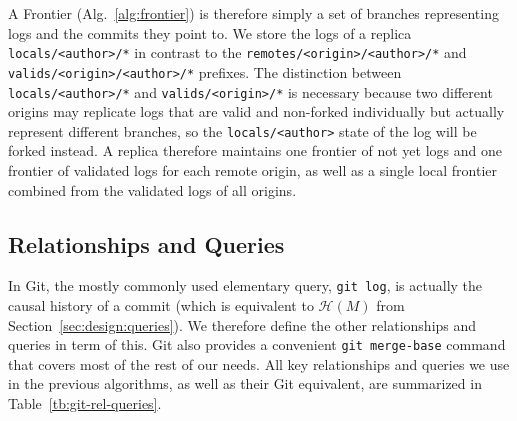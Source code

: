 \documentclass[9pt, oneside]{article}   	%
\begin{document}
A Frontier (Alg.~\ref{alg:frontier}) is therefore simply a set of branches representing logs and the commits they point to. We store the logs of a replica \texttt{locals/<author>/*} in contrast to the \texttt{remotes/<origin>/<author>/*} and \texttt{valids/<origin>/<author>/*} prefixes. The distinction between \texttt{locals/<author>/*} and \texttt{valids/<origin>/*} is necessary because two different origins may replicate logs that are valid and non-forked individually but actually represent different branches, so the \texttt{locals/<author>} state of the log will be forked instead. A replica therefore maintains one frontier of not yet logs and one frontier of validated logs for each remote origin, as well as a single local frontier combined from the validated logs of all origins.

\subsection{Relationships and Queries}
\label{sec:git-implementation:rel-queries}

In Git, the mostly commonly used elementary query, \texttt{git log}, is actually the causal history of a commit (which is equivalent to $\mathcal{H}(M)$ from Section~\ref{sec:design:queries}). We therefore define the other relationships and queries in term of this. Git also provides a convenient \texttt{git merge-base} command that covers most of the rest of our needs. All key relationships and queries we use in the previous algorithms, as well as their Git equivalent, are summarized in Table~\ref{tb:git-rel-queries}.
\end{document}
